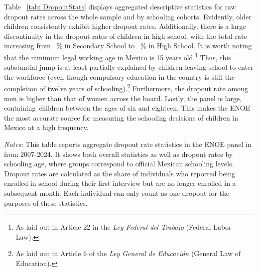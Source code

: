\documentclass[12pt,letter,english,intoc,bibliography=totoc,index=totoc,BCOR10mm,captions=tableheading,nottitlepage,fleqn]{article}
\theoremstyle{break}
\begin{document}
Table ~\ref{tab: DropoutStats} displays aggregated descriptive statistics for raw dropout rates across the whole sample and by schooling cohorts. Evidently, older children consistently exhibit higher dropout rates. Additionally, there is a large discontinuity in the dropout rates of children in high school, with the total rate increasing from \dRateSecondary\ \% in Secondary School to \dRateHigh\ \% in High School. It is worth noting that the minimum legal working age in Mexico is 15 years old.\footnote{As laid out in Article 22 in the \textit{Ley Federal del Trabajo} (Federal Labor Law).} Thus, this substantial jump is at least partially explained by children leaving school to enter the workforce (even though compulsory education in the country is still the completion of twelve years of schooling).\footnote{As laid out in Article 6 of the \textit{Ley General de Educaci\'{o}n} (General Law of Education).} Furthermore, the dropout rate among men is higher than that of women across the board. Lastly, the panel is large, containing\totalKids\ children between the ages of six and eighteen. This makes the ENOE the most accurate source for measuring the schooling decisions of children in Mexico at a high frequency.

\begin{table}[H]
\caption{Summary Statistics: Dropout Rate}
\label{tab: DropoutStats}
\centering
\footnotesize

\vspace{2mm}
\begin{minipage}{0.95\linewidth}
\scriptsize \singlespacing
\textit{Notes:} This table reports aggregate dropout rate statistics in the ENOE panel in from 2007-2024. It shows both overall statistics as well as dropout rates by schooling age, where groups correspond to official Mexican schooling levels. Dropout rates are calculated as the share of individuals who reported being enrolled in school during their first interview but are no longer enrolled in a subsequent month. Each individual can only count as one dropout for the purposes of these statistics.  
\end{minipage}
\end{table}
\end{document}
